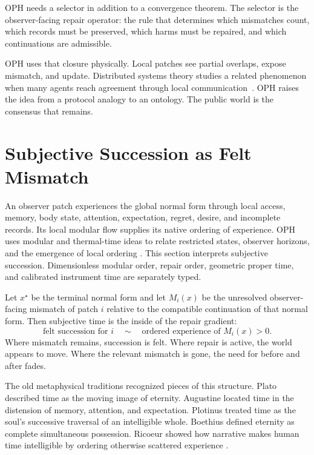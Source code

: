 \documentclass[11pt]{article}
\theoremstyle{remark}
\theoremstyle{plain}
\begin{document}
OPH needs a selector in addition to a convergence theorem. The
selector is the observer-facing repair operator: the rule that determines which
mismatches count, which records must be preserved, which harms must be repaired,
and which continuations are admissible.

OPH uses that closure physically. Local patches see partial overlaps, expose
mismatch, and update. Distributed systems theory
studies a related phenomenon when many agents reach agreement through local
communication~\cite{Olfati2007,Lamport1982}. OPH raises the idea from a
protocol analogy to an ontology. The public world is the consensus that remains.

\section{Subjective Succession as Felt Mismatch}

An observer patch experiences the global normal form through local access,
memory, body state, attention, expectation, regret, desire, and incomplete
records. Its local modular flow supplies its native ordering of experience.
OPH uses modular and thermal-time ideas to relate restricted states,
observer horizons, and the emergence of local ordering
\cite{OPHObservers,ConnesRovelli1994,PageWootters1983}.
This section interprets subjective succession. Dimensionless modular order,
repair order, geometric proper time, and calibrated instrument time are
separately typed.

Let \(x^\star\) be the terminal normal form and let \(M_i(x)\) be the unresolved
observer-facing mismatch of patch \(i\) relative to the compatible continuation
of that normal form. Then subjective time is the inside of the repair gradient:
\[
\boxed{
\text{felt succession for }i \quad\sim\quad \text{ordered experience of } M_i(x)>0 .
}
\]
Where mismatch remains, succession is felt. Where repair is active, the world
appears to move. Where the relevant mismatch is gone, the need for before and
after fades.

The old metaphysical traditions recognized pieces of this structure. Plato
described time as the moving image of eternity. Augustine located time in the
distension of memory, attention, and expectation. Plotinus treated time as the
soul's successive traversal of an intelligible whole. Boethius defined eternity
as complete simultaneous possession. Ricoeur showed how narrative makes human
time intelligible by ordering otherwise scattered experience
\cite{PlatoTimaeus,AugustineConfessions,PlotinusEnneads,BoethiusConsolation,Ricoeur1984}.
\end{document}
